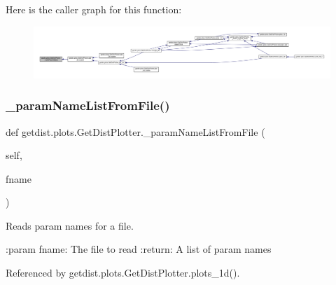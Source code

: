 Here is the caller graph for this function\+:
\nopagebreak
\begin{figure}[H]
\begin{center}
\leavevmode
\includegraphics[width=350pt]{classgetdist_1_1plots_1_1GetDistPlotter_a1f1a9291eabe11286d6687a482558397_icgraph}
\end{center}
\end{figure}
\mbox{\label{classgetdist_1_1plots_1_1GetDistPlotter_a63da566e8c3acdfff3865ae29e73ba4d}} 
\subsubsection{\texorpdfstring{\+\_\+param\+Name\+List\+From\+File()}{\_paramNameListFromFile()}}
{\footnotesize\ttfamily def getdist.\+plots.\+Get\+Dist\+Plotter.\+\_\+param\+Name\+List\+From\+File (\begin{DoxyParamCaption}\item[{}]{self,  }\item[{}]{fname }\end{DoxyParamCaption})\hspace{0.3cm}{\ttfamily [private]}}

\begin{DoxyVerb}Reads param names for a file.

:param fname: The file to read
:return: A list of param names
\end{DoxyVerb}
 

Referenced by getdist.\+plots.\+Get\+Dist\+Plotter.\+plots\+\_\+1d().

